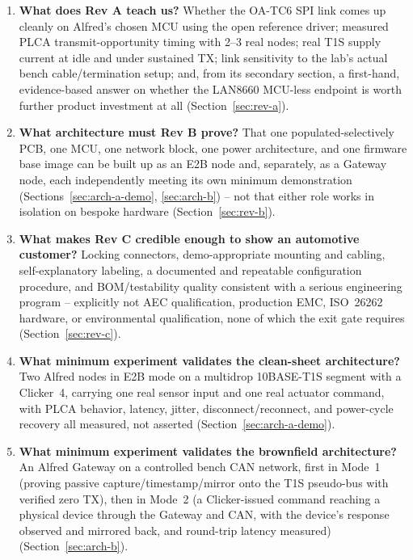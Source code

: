 \begin{enumerate}[itemsep=0.4em]
\item \textbf{What does Rev A teach us?}
Whether the OA-TC6 SPI link comes up cleanly on Alfred's chosen MCU using the open reference driver; measured PLCA transmit-opportunity timing with 2--3 real nodes; real T1S supply current at idle and under sustained TX; link sensitivity to the lab's actual bench cable/termination setup; and, from its secondary section, a first-hand, evidence-based answer on whether the LAN8660 MCU-less endpoint is worth further product investment at all (Section~\ref{sec:rev-a}).

\item \textbf{What architecture must Rev B prove?}
That one populated-selectively PCB, one MCU, one network block, one power architecture, and one firmware base image can be built up as an E2B node and, separately, as a Gateway node, each independently meeting its own minimum demonstration (Sections~\ref{sec:arch-a-demo}, \ref{sec:arch-b}) -- not that either role works in isolation on bespoke hardware (Section~\ref{sec:rev-b}).

\item \textbf{What makes Rev C credible enough to show an automotive customer?}
Locking connectors, demo-appropriate mounting and cabling, self-explanatory labeling, a documented and repeatable configuration procedure, and BOM/testability quality consistent with a serious engineering program -- explicitly not AEC qualification, production EMC, ISO~26262 hardware, or environmental qualification, none of which the exit gate requires (Section~\ref{sec:rev-c}).

\item \textbf{What minimum experiment validates the clean-sheet architecture?}
Two Alfred nodes in E2B mode on a multidrop 10BASE-T1S segment with a Clicker~4, carrying one real sensor input and one real actuator command, with PLCA behavior, latency, jitter, disconnect/reconnect, and power-cycle recovery all measured, not asserted (Section~\ref{sec:arch-a-demo}).

\item \textbf{What minimum experiment validates the brownfield architecture?}
An Alfred Gateway on a controlled bench CAN network, first in Mode~1 (proving passive capture/timestamp/mirror onto the T1S pseudo-bus with verified zero TX), then in Mode~2 (a Clicker-issued command reaching a physical device through the Gateway and CAN, with the device's response observed and mirrored back, and round-trip latency measured) (Section~\ref{sec:arch-b}).


\end{enumerate}
